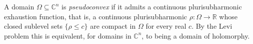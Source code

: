 
A domain $\Omega\subseteq\mathbb C^n$ is \emph{pseudoconvex} if it admits a continuous plurisubharmonic exhaustion function, that is, a continuous plurisubharmonic $\rho:\Omega\to\mathbb R$ whose closed sublevel sets $\{\rho\le c\}$ are compact in $\Omega$ for every real $c$. By the Levi problem this is equivalent, for domains in $\mathbb C^n$, to being a domain of holomorphy.
